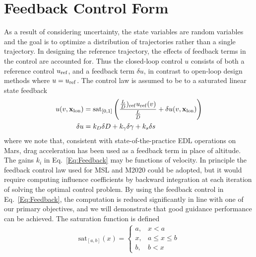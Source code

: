 \section{Feedback Control Form}
As a result of considering uncertainty, the state variables are random variables and the goal is to optimize a distribution of trajectories rather than a single trajectory.
In designing the reference trajectory, the effects of feedback terms in the control are accounted for. Thus the closed-loop control $u$ consists of both a reference control $u_{\mathrm{ref}}$, and a feedback term $\delta u$, in contrast to open-loop design methods where $u=u_{\mathrm{ref}}$. 
The control law is assumed to be to a saturated linear state feedback 
\begin{align}
	u(v,\mathbf{x}_{\mathrm{lon}}) &= \mathrm{sat}_{[0,1]}\left(\frac{\frac{L}{D})_{\mathrm{ref}}u_{\mathrm{ref}}(v)}{\frac{L}{D}} + \delta u(v,\mathbf{x}_{\mathrm{lon}})\right) \label{Eq:Control}\\
	\delta u &= k_D\delta D + k_{\gamma}\delta\gamma + k_s\delta s \label{Eq:Feedback}
\end{align}
where we note that, consistent with state-of-the-practice EDL operations on Mars, drag acceleration has been used as a feedback term in place of altitude. 
The gains $k_i$ in Eq.~\eqref{Eq:Feedback} may be functions of velocity. 
In principle the feedback control law used for MSL and M2020 could be adopted, but it would require computing influence coefficients by backward integration at each iteration of solving the optimal control problem. By using the feedback control in Eq.~\eqref{Eq:Feedback}, the computation is reduced significantly in line with one of our primary objectives, and we will demonstrate that good guidance performance can be achieved.
The saturation function is defined
\begin{align*}
	\mathrm{sat}_{[a,b]}(x) = \left\{\begin{array}{lc}
		a, &  x < a\\
		x, &  a\le x \le b\\
		b, &  b < x
	\end{array} \right. %
\end{align*}
